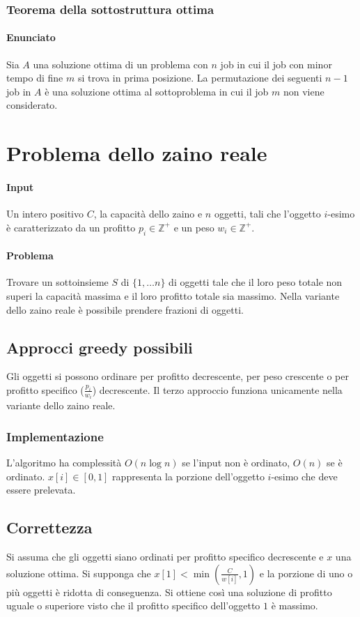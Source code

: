 	\subsubsection{Teorema della sottostruttura ottima}
	\paragraph{Enunciato}
	Sia $A$ una soluzione ottima di un problema con $n$ job in cui il job con minor tempo di fine $m$ si trova in prima posizione. La permutazione dei seguenti $n-1$ job in $A$ \`e una
	soluzione ottima al sottoproblema in cui il job $m$ non viene considerato. 
	\section{Problema dello zaino reale}
	\paragraph{Input}
	Un intero positivo $C$, la capacit\`a dello zaino e $n$ oggetti, tali che l'oggetto $i$-esimo \`e caratterizzato da un profitto $p_i\in\mathbb{Z}^+$ e un peso $w_i\in\mathbb{Z}^+$.
	\paragraph{Problema}
	Trovare un sottoinsieme $S$ di $\{1,\dots n\}$ di oggetti tale che il loro peso totale non superi la capacit\`a massima e il loro profitto totale sia massimo. Nella variante dello zaino
	reale \`e possibile prendere frazioni di oggetti.
	\subsection{Approcci greedy possibili}
	Gli oggetti si possono ordinare per profitto decrescente, per peso crescente o per profitto specifico ($\frac{p_i}{w_i}$) decrescente. Il terzo approccio funziona unicamente nella
	variante dello zaino reale.
	\subsubsection{Implementazione}
	
	L'algoritmo ha complessit\`a $O(n\log n)$ se l'input non \`e ordinato, $O(n)$ se \`e ordinato. $x[i]\in[0, 1]$ rappresenta la porzione dell'oggetto $i$-esimo che deve essere 
	prelevata.
	\subsection{Correttezza}
	Si assuma che gli oggetti siano ordinati per profitto specifico decrescente e $x$ una soluzione ottima. Si supponga che $x[1] < \min(\frac{C}{w[i]}, 1)$ e la porzione di uno o pi\`u
	oggetti \`e ridotta di conseguenza. Si ottiene cos\`i una soluzione di profitto uguale o superiore visto che il profitto specifico dell'oggetto $1$ \`e massimo. 
